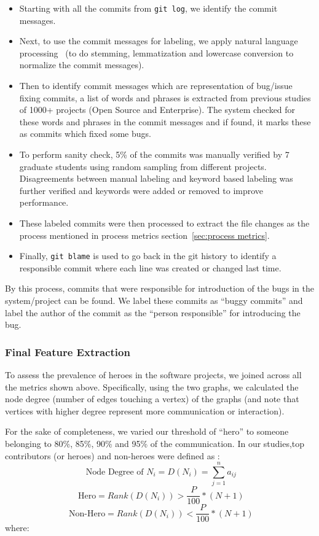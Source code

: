 \documentclass[smallextended]{svjour3}
\newcommand{\bi}{\begin{itemize}}
\newcommand{\ei}{\end{itemize}}
\begin{document}
\bi
\item
Starting with all the commits from {\tt git log},
we identify the commit messages.
\item
Next,  to use the commit messages for labeling,
we apply natural language processing~\cite{hindle2008large,rosen2015commit}
(to do  stemming, lemmatization and lowercase conversion to normalize the commit messages).
\item
Then to identify commit messages which are representation of bug/issue fixing commits, a list of words and phrases is  extracted from previous studies of 1000+ projects (Open Source and Enterprise). The system checked for these words and phrases in the commit messages and if found, it marks these as commits which fixed some bugs.
\item
To perform sanity check,  5\% of the commits was manually verified by 7 graduate students using random sampling from different projects. Disagreements between manual labeling and keyword based labeling was further verified and keywords were added or removed to improve performance.
\item
These labeled commits were then processed to extract the file changes as the process mentioned in process metrics section~\ref{sec:process metrics}.
\item
Finally,  {\tt git blame} is used to go back in the git history to identify a responsible commit where each line was created or changed last time.
\ei
By this process, commits that were responsible for introduction of the bugs in the system/project can be found. We label these commits as
``buggy commits'' and label the author of the commit as the ``person responsible'' for introducing the bug.






\subsubsection{Final Feature Extraction}
\label{sec:Finding Relation}
To assess the prevalence of
heroes in the software projects,  we joined across all the metrics shown above.
Specifically, using the two graphs,   we calculated the node degree (number of edges touching
a vertex) of the graphs
(and note that vertices with higher degree represent more communication or interaction). 

For the sake of completeness, we   varied our threshold of ``hero'' to someone belonging to  80\%, 85\%, 90\% and 95\% of the communication.  
In our studies,top contributors (or heroes) and non-heroes
 were defined as : 
\begin{equation}
\label{eq:node-Degree}
    \mbox{ Node Degree of } N_i = D(N_i)= \sum_{j=1}^{n} a_{ij}
\end{equation}
\begin{equation}
\label{eq:hero}
    \mbox{  Hero} = Rank\left(D(N_i)\right) > \frac{P}{100}*(N + 1)
\end{equation}
\begin{equation}
\label{eq:non-hero}
    \mbox{  Non-Hero} = Rank\left(D(N_i)\right) < \frac{P}{100}*(N + 1)
\end{equation}
where:
\end{document}
